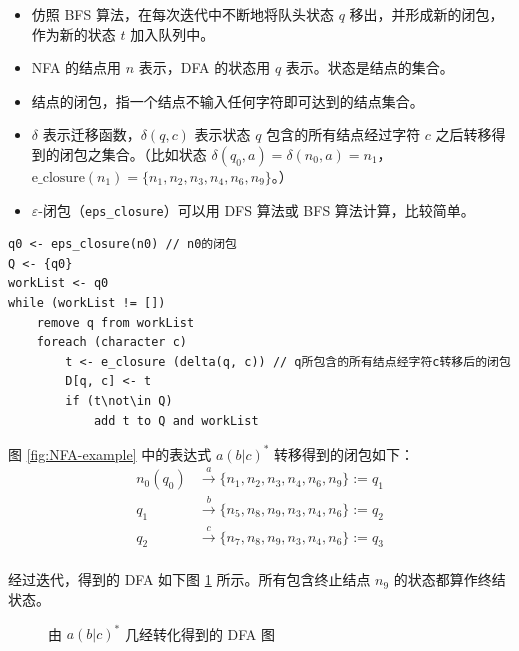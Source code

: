 \documentclass[UTF8]{ctexart}
\newcommand\Notes[1]{\textcolor{yellow!50!black}{\small #1}}
\begin{document}
\begin{itemize}[leftmargin=1.5cm]
  \item 仿照 BFS 算法，在每次迭代中不断地将队头状态 $q$ 移出，并形成新的闭包，作为新的状态 $t$ 加入队列中。
  \item NFA 的结点用 $n$ 表示，DFA 的状态用 $q$ 表示。状态是结点的集合。
  \item 结点的闭包，指一个结点不输入任何字符即可达到的结点集合。
  \item $\delta$ 表示迁移函数，$\delta(q,c)$ 表示状态 $q$ 包含的所有结点经过字符 $c$ 之后转移得到的闭包之集合。\Notes{（比如状态 $\delta(q_0,a) = \delta(n_0,a) = n_1$，$\mathrm{e\_closure}(n_1) = \{n_1,n_2,n_3,n_4,n_6,n_9\}$。）}
  \item $\varepsilon$-闭包（\verb!eps_closure!）可以用 DFS 算法或 BFS 算法计算，比较简单。
\end{itemize}

\begin{lstlisting}
q0 <- eps_closure(n0) // n0的闭包
Q <- {q0}
workList <- q0
while (workList != [])
    remove q from workList
    foreach (character c)
        t <- e_closure (delta(q, c)) // q所包含的所有结点经字符c转移后的闭包
        D[q, c] <- t
        if (t\not\in Q)
            add t to Q and workList
\end{lstlisting}

图 \ref{fig:NFA-example} 中的表达式 $a(b|c)^*$ 转移得到的闭包如下：
\begin{align*}
    n_0(q_0) & \xrightarrow{a} \{n_1, n_2, n_3, n_4, n_6, n_9\} := q_1 \\
    q_1 &\xrightarrow{b} \{n_5, n_8, n_9, n_3, n_4, n_6\} := q_2 \\
    q_2 &\xrightarrow{c} \{n_7, n_8, n_9, n_3, n_4, n_6\} := q_3 \\
\end{align*}

经过迭代，得到的 DFA 如下图 \ref{fig:DFA-example} 所示。所有包含终止结点 $n_9$ 的状态都算作终结状态。
\begin{figure}[htb]
    \centering
    \caption{由 $a(b|c)^*$ 几经转化得到的 DFA 图}\label{fig:DFA-example}
\end{figure}
\end{document}
